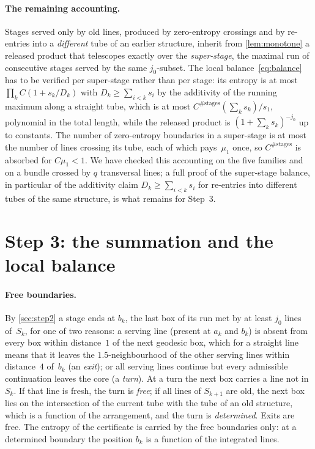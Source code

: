 \documentclass[11pt,letterpaper]{article}
\begin{document}
\paragraph{The remaining accounting.} Stages served only by old lines, produced by zero-entropy crossings and by re-entries into a \emph{different} tube of an earlier structure, inherit from \cref{lem:monotone} a released product that telescopes exactly over the \emph{super-stage}, the maximal run of consecutive stages served by the same $j_0$-subset. The local balance~\eqref{eq:balance} has to be verified per super-stage rather than per stage: its entropy is at most $\prod_kC(1+s_k/D_k)$ with $D_k\ge\sum_{i<k}s_i$ by the additivity of the running maximum along a straight tube, which is at most $C^{\#\text{stages}}(\sum_ks_k)/s_1$, polynomial in the total length, while the released product is $(1+\sum_ks_k)^{-j_0}$ up to constants. The number of zero-entropy boundaries in a super-stage is at most the number of lines crossing its tube, each of which pays~$\mu_1$ once, so $C^{\#\text{stages}}$ is absorbed for $C\mu_1<1$. We have checked this accounting on the five families and on a bundle crossed by $q$ transversal lines; a full proof of the super-stage balance, in particular of the additivity claim $D_k\ge\sum_{i<k}s_i$ for re-entries into different tubes of the same structure, is what remains for Step~3.

\section{Step 3: the summation and the local balance}
\label{sec:step3}

\paragraph{Free boundaries.} By \cref{sec:step2} a stage ends at $b_k$, the last box of its run met by at least $j_0$ lines of~$S_k$, for one of two reasons: a serving line (present at $a_k$ and $b_k$) is absent from every box within distance~$1$ of the next geodesic box, which for a straight line means that it leaves the $1.5$-neighbourhood of the other serving lines within distance~$4$ of~$b_k$ (an \emph{exit}); or all serving lines continue but every admissible continuation leaves the core (a \emph{turn}). At a turn the next box carries a line not in~$S_k$. If that line is fresh, the turn is \emph{free}; if all lines of $S_{k+1}$ are old, the next box lies on the intersection of the current tube with the tube of an old structure, which is a function of the arrangement, and the turn is \emph{determined}. Exits are free. The entropy of the certificate is carried by the free boundaries only: at a determined boundary the position $b_k$ is a function of the integrated lines.
\end{document}

